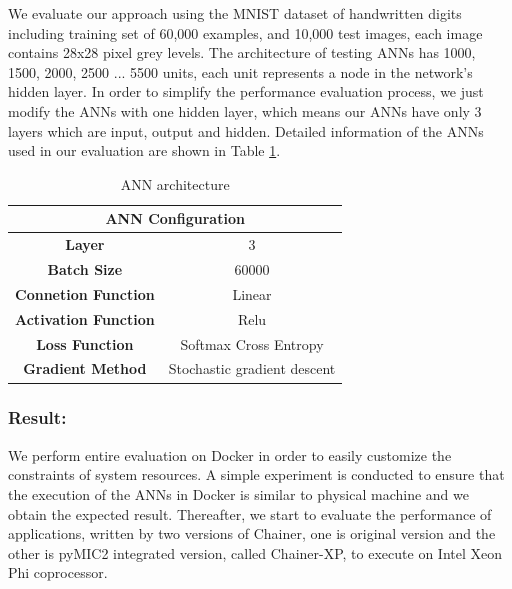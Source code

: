We evaluate our approach using the MNIST \cite{mnist} dataset of handwritten digits including training set of 60,000 examples,  and 10,000 test images, each image contains 28x28 pixel grey levels. The architecture of testing ANNs has 1000, 1500, 2000, 2500 ... 5500 units, each unit represents a node in the network's hidden layer. In order to simplify the performance evaluation process, we just modify the ANNs with one hidden layer, which means our ANNs have only 3 layers which are input, output and hidden. Detailed information of the ANNs used in our evaluation are shown in Table \ref{tab:ann-info}.
%
\begin{table}[]
\centering
\caption{ANN architecture}
\label{tab:ann-info}
\begin{tabular}{|c|c|}
\hline
\multicolumn{2}{|c|}{\textbf{ANN Configuration}}\\ \hline
\textbf{Layer} 	& 3 \\
\textbf{Batch Size} & 60000 \\
\textbf{Connetion Function} & Linear  \\
\textbf{Activation Function} & Relu  \\
\textbf{Loss Function} & Softmax Cross Entropy \\
\textbf{Gradient Method} &  Stochastic gradient descent \\
\hline
\end{tabular} 
\end{table}
\subsubsection{Result:}
%
We perform entire evaluation on Docker \cite{docker} in order to easily customize the constraints of system resources. A simple experiment is conducted to ensure that the execution of the ANNs in Docker is similar to physical machine and we obtain the expected result. Thereafter, we start to evaluate the performance of applications, written by two versions of Chainer, one is original version and the other is pyMIC2 integrated version, called Chainer-XP, to execute on Intel Xeon Phi coprocessor.

